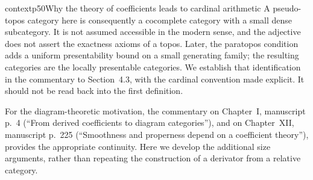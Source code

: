 \begin{dcomment}{context}{p50}{Why the theory of coefficients leads to cardinal arithmetic}
A pseudo-topos category here is consequently a cocomplete category with a small dense subcategory. It is not assumed accessible in the modern sense, and the adjective does not assert the exactness axioms of a topos. Later, the paratopos condition adds a uniform presentability bound on a small generating family; the resulting categories are the locally presentable categories. We establish that identification in the commentary to Section~4.3, with the cardinal convention made explicit. It should not be read back into the first definition.

For the diagram-theoretic motivation, the commentary on Chapter~I, manuscript p.~4 (``From derived coefficients to diagram categories''), and on Chapter~XII, manuscript p.~225 (``Smoothness and properness depend on a coefficient theory''), provides the appropriate continuity. Here we develop the additional size arguments, rather than repeating the construction of a derivator from a relative category.
\end{dcomment}

